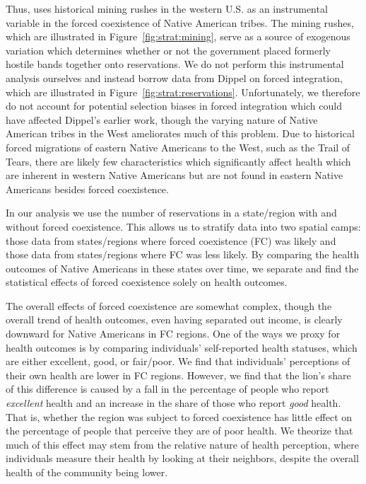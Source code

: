 \documentclass[12pt]{article}
\begin{document}
Thus, \cite{dippel2010forced} uses historical mining rushes in the western U.S. as an instrumental variable in the forced coexistence of Native American tribes.
The mining rushes, which are illustrated in Figure~\ref{fig:strat:mining}, serve as a source of exogenous variation which determines whether or not the government placed formerly hostile bands together onto reservations.
We do not perform this instrumental analysis ourselves and instead borrow data from Dippel on forced integration, which are illustrated in Figure~\ref{fig:strat:reservations}. 
Unfortunately, we therefore do not account for potential selection biases in forced integration which could have affected Dippel's earlier work, though the varying nature of Native American tribes in the West ameliorates much of this problem.
Due to historical forced migrations of eastern Native Americans to the West, such as the Trail of Tears, there are likely few characteristics which significantly affect health which are inherent in western Native Americans but are not found in eastern Native Americans besides forced coexistence.

In our analysis we use the number of reservations in a state/region with and without forced coexistence.
This allows us to stratify data into two spatial camps: those data from states/regions where forced coexistence (FC) was likely and those data from states/regions where FC was less likely.
By comparing the health outcomes of Native Americans in these states over time, we separate and find the statistical effects of forced coexistence solely on health outcomes.
    
The overall effects of forced coexistence are somewhat complex, though the overall trend of health outcomes, even having separated out income, is clearly downward for Native Americans in FC regions. 
One of the ways we proxy for health outcomes is by comparing individuals' self-reported health statuses, which are either excellent, good, or fair/poor.
We find that individuals' perceptions of their own health are lower in FC regions. 
However, we find that the lion's share of this difference is caused by a fall in the percentage of people who report \emph{excellent} health and an increase in the share of those who report \emph{good} health.
That is, whether the region was subject to forced coexistence has little effect on the percentage of people that perceive they are of poor health. 
We theorize that much of this effect may stem from the relative nature of health perception, where individuals measure their health by looking at their neighbors, despite the overall health of the community being lower.
\end{document}
